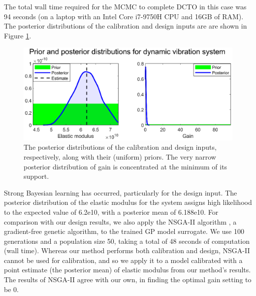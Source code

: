 \documentclass[12pt]{article}
\begin{document}
%
The total wall time required for the MCMC to complete DCTO in this case was 94 seconds (on a laptop with an Intel Core i7-9750H CPU and 16GB of RAM).
%
The posterior distributions of the calibration and design inputs are are shown in Figure \ref{fig:dvs_calib_and_design}.
%
\begin{figure}
	\centering
	\includegraphics[scale=0.85]{FIG_DVS_DCTO_input_posteriors}
	\captionsetup{width=.85\linewidth}
	\caption{The posterior distributions of the calibration and design inputs, respectively, along with their (uniform) priors. The very narrow posterior distribution of gain is concentrated at the minimum of its support.}
	\label{fig:dvs_calib_and_design}
\end{figure}
%
Strong Bayesian learning has occurred, particularly for the design input.
%
The posterior distribution of the elastic modulus for the system assigns high likelihood to the expected value of 6.2e10, with a posterior mean of 6.188e10.
%
For comparison with our design results, we also apply the NSGA-II algorithm \citep{Deb2002}, a gradient-free genetic algorithm, to the trained GP model surrogate.
%
We use 100 generations and a population size 50, taking a total of 48 seconds of computation (wall time).
%
Whereas our method performs both calibration and design, NSGA-II cannot be used for calibration, and so we apply it to a model calibrated with a point estimate (the posterior mean) of elastic modulus from our method's results.
%
The results of NSGA-II agree with our own, in finding the optimal gain setting to be 0.
%
\end{document}
